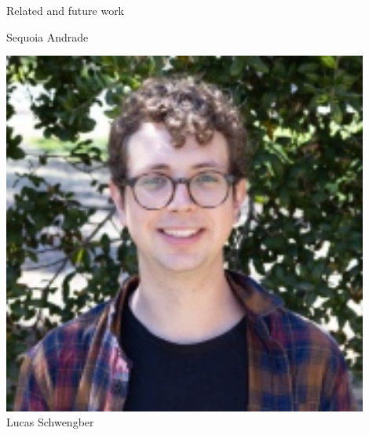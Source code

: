 \begin{frame}{Related and future work}
\begin{minipage}[t]{0.24\textwidth}
    Sequoia Andrade
\end{minipage}
\begin{minipage}[t]{0.24\textwidth}
    \centering
\includegraphics[width=0.9\textwidth]{static_figures/lucas.jpg}\\
Lucas Schwengber
\end{minipage}

\end{frame}



